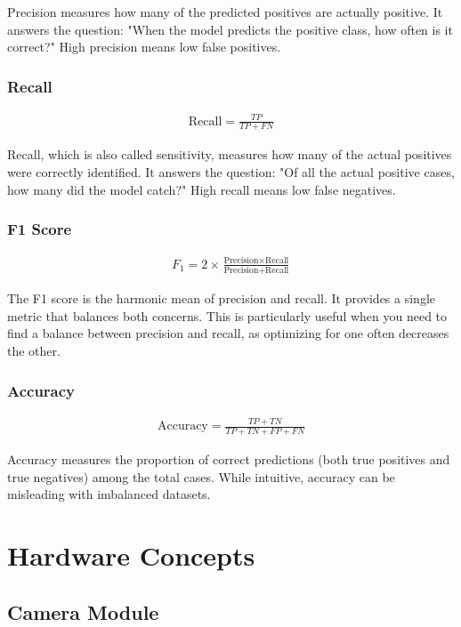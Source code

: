 Precision measures how many of the predicted positives are actually positive. It answers the question: 
"When the model predicts the positive class, how often is it correct?" High precision means low false positives.

\subsubsection{Recall}
\begin{eqnarray}
	\text{Recall} = \frac{TP}{TP + FN}
	\label{eq:recall}
\end{eqnarray}

Recall, which is also called sensitivity, measures how many of the actual positives were correctly identified. 
It answers the question: 
"Of all the actual positive cases, how many did the model catch?" High recall means low false negatives.

\subsubsection{F1 Score}
\begin{eqnarray}
	F_1 = 2\times \frac{\text{Precision} \times \text{Recall}}{\text{Precision} + \text{Recall}}
	\label{eq:f1_score}
\end{eqnarray}

The F1 score is the harmonic mean of precision and recall. It provides a single metric that balances 
both concerns. This is particularly useful when you need to 
find a balance between precision and recall, as optimizing for one often decreases the other.

\subsubsection{Accuracy}
\begin{eqnarray}
	\text{Accuracy} = \frac{TP + TN}{TP + TN + FP + FN}
	\label{eq:accuracy}
\end{eqnarray}

Accuracy measures the proportion of correct predictions (both true positives and true negatives)
 among the total cases. While intuitive, accuracy can be misleading with imbalanced datasets.

\section{Hardware Concepts}

\subsection{Camera Module} 

